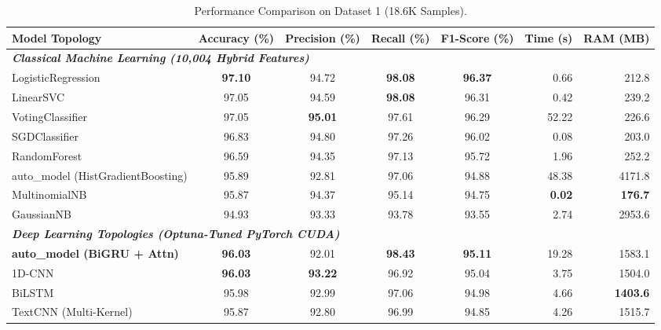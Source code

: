 \documentclass[conference]{IEEEtran}
\begin{document}
\begin{table}[!t]
\caption{Performance Comparison on Dataset 1 (18.6K Samples).}
\label{tab:d1_results}
\centering\small
\begin{tabularx}{\textwidth}{@{}l c c c c r r@{}}
\toprule
\textbf{Model Topology} & \textbf{Accuracy (\%)} & \textbf{Precision (\%)} & \textbf{Recall (\%)} & \textbf{F1-Score (\%)} & \textbf{Time (s)} & \textbf{RAM (MB)} \\
\midrule
\multicolumn{7}{l}{\textit{\textbf{Classical Machine Learning (10,004 Hybrid Features)}}} \\
LogisticRegression                  & \textbf{97.10} & 94.72 & \textbf{98.08} & \textbf{96.37} & 0.66  & 212.8   \\
LinearSVC                           & 97.05          & 94.59 & \textbf{98.08} & 96.31          & 0.42  & 239.2   \\
VotingClassifier                    & 97.05          & \textbf{95.01} & 97.61 & 96.29          & 52.22 & 226.6   \\
SGDClassifier                       & 96.83          & 94.80 & 97.26          & 96.02          & 0.08  & 203.0   \\
RandomForest                        & 96.59          & 94.35 & 97.13          & 95.72          & 1.96  & 252.2   \\
auto\_model (HistGradientBoosting)  & 95.89          & 92.81 & 97.06          & 94.88          & 48.38 & 4171.8  \\
MultinomialNB                       & 95.87          & 94.37 & 95.14          & 94.75          & \textbf{0.02} & \textbf{176.7} \\
GaussianNB                          & 94.93          & 93.33 & 93.78          & 93.55          & 2.74  & 2953.6  \\
\midrule
\multicolumn{7}{l}{\textit{\textbf{Deep Learning Topologies (Optuna-Tuned PyTorch CUDA)}}} \\
\textbf{auto\_model (BiGRU + Attn)} & \textbf{96.03} & 92.01          & \textbf{98.43} & \textbf{95.11} & 19.28          & 1583.1  \\
1D-CNN                              & \textbf{96.03} & \textbf{93.22} & 96.92          & 95.04          & 3.75           & 1504.0  \\
BiLSTM                              & 95.98          & 92.99          & 97.06          & 94.98          & 4.66           & \textbf{1403.6}  \\
TextCNN (Multi-Kernel)             & 95.87          & 92.80          & 96.99          & 94.85          & 4.26           & 1515.7  \\

\end{tabularx}
\end{table}
\end{document}
